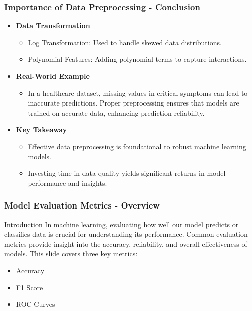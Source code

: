 \documentclass[aspectratio=169]{beamer}
\begin{document}
\begin{frame}[fragile]
    \frametitle{Importance of Data Preprocessing - Conclusion}
    \begin{itemize}
        \item \textbf{Data Transformation}
            \begin{itemize}
                \item Log Transformation: Used to handle skewed data distributions.
                \item Polynomial Features: Adding polynomial terms to capture interactions.
            \end{itemize}

        \item \textbf{Real-World Example}
            \begin{itemize}
                \item In a healthcare dataset, missing values in critical symptoms can lead to inaccurate predictions. 
                Proper preprocessing ensures that models are trained on accurate data, enhancing prediction reliability.
            \end{itemize}

        \item \textbf{Key Takeaway}
            \begin{itemize}
                \item Effective data preprocessing is foundational to robust machine learning models.
                \item Investing time in data quality yields significant returns in model performance and insights.
            \end{itemize}
    \end{itemize}
\end{frame}

\begin{frame}[fragile]
    \frametitle{Model Evaluation Metrics - Overview}
    \begin{block}{Introduction}
        In machine learning, evaluating how well our model predicts or classifies data is crucial for understanding its performance. Common evaluation metrics provide insight into the accuracy, reliability, and overall effectiveness of models. This slide covers three key metrics: 
        \begin{itemize}
            \item Accuracy
            \item F1 Score
            \item ROC Curves
        \end{itemize}
    \end{block}
\end{frame}
\end{document}
